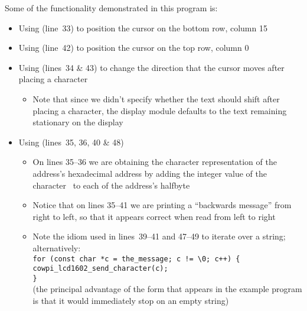 {    Some of the functionality demonstrated in this program is:
    \begin{itemize}
        \item Using \hyperlink{function:cowpi_lcd1602_place_cursor}{} (line~33) to position the cursor on the bottom row, column 15
        \item Using \hyperlink{function:cowpi_lcd1602_return_home}{} (line~42) to position the cursor on the top row, column 0
        \item Using \hyperlink{function:cowpi_lcd1602_send_command}{} (lines~34 \& 43) to change the direction that the cursor moves after placing a character
            \begin{itemize}
                \item Note that since we didn't specify whether the text should shift after placing a character, the display module defaults to the text remaining stationary on the display
            \end{itemize}
        \item Using \hyperlink{function:cowpi_lcd1602_send_character}{} (lines~35, 36, 40 \& 48)
            \begin{itemize}
                \item On lines 35--36 we are obtaining the character representation of the address's hexadecimal address by adding the integer value of the character \textquotesingle\ to each of the address's halfbyte
                \item Notice that on lines 35--41 we are printing a ``backwards message'' from right to left, so that it appears correct when read from left to right
                \item Note the idiom used in lines~39--41 and 47--49 to iterate over a string;
                    alternatively: \\ %
                    \texttt{for (const char *c = the\_message; c != \textquotesingle\textbackslash 0\textquotesingle; c++) \{ \\
                    \hspace*{1cm}cowpi\_lcd1602\_send\_character(c); \\
                    \}} \\
                    (the principal advantage of the form that appears in the example program is that it would immediately stop on an empty string)
            \end{itemize}
    \end{itemize}

}
